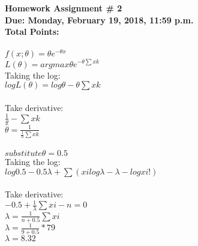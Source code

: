 \documentclass[11pt]{article}
\newcounter{totalmarks}
\begin{document}

\begin{center}
\bfseries
{\Large Homework Assignment \# 2}\\
   Due: Monday, February 19, 2018, 11:59 p.m. \\
   Total Points: 
\end{center}



\paragraph{}
$f(x;\theta) = \theta e^{-\theta x}$\\
$L(\theta) = argmax\theta e^{-\theta \sum xk}$\\
Taking the log:\\
$logL(\theta) = log\theta - \theta \sum xk$\\
\\
Take derivative:\\
$\frac{1}{\theta} - \sum xk$\\
$\hat{\theta} = \frac{1}{\frac{1}{n}\sum xk}$\\



\paragraph{}
$substitute \theta = 0.5$\\
Taking the log:\\
$log0.5 - 0.5\lambda + \sum (xilog\lambda - \lambda - logxi!)$\\
\\
Take derivative:\\
$-0.5 + \frac{1}{\lambda} \sum xi - n = 0$\\
$\lambda = \frac{1}{n + 0.5}\sum xi$\\
$ \lambda = \frac{1}{9+0.5} * 79$\\
$ \lambda = 8.32$

\end{document}
